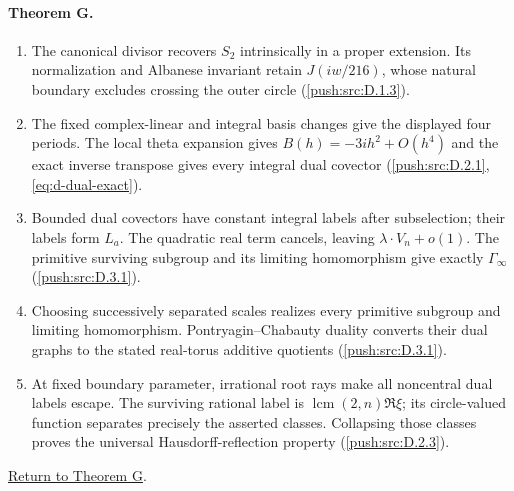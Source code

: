 \documentclass[11pt,a4paper]{article}
\theoremstyle{definition}
\begin{document}
\hypertarget{outline-I-G}{}
\paragraph{Theorem G.}
\begin{enumerate}[label=\arabic*.]
\item\hypertarget{step-I-G-1}{} The canonical divisor recovers
$S_2$ intrinsically in a proper extension.  Its normalization
and Albanese invariant retain $J(iw/216)$, whose natural boundary
excludes crossing the outer circle
(\hyperref[push:src:D.1.3]{\ref*{push:src:D.1.3}}).
\item\hypertarget{step-I-G-2}{} The fixed complex-linear and
integral basis changes give the displayed four periods.
The local theta expansion gives $B(h)=-3ih^2+O(h^4)$ and
the exact inverse transpose gives every integral dual covector
(\hyperref[push:src:D.2.1]{\ref*{push:src:D.2.1}},
\hyperref[eq:d-dual-exact]{\ref*{eq:d-dual-exact}}).
\item\hypertarget{step-I-G-3}{} Bounded dual covectors have
constant integral labels after subselection; their labels form
$L_a$.  The quadratic real term cancels, leaving
$\lambda\cdot V_n+o(1)$.  The primitive surviving subgroup and
its limiting homomorphism give exactly $\Gamma_\infty$
(\hyperref[push:src:D.3.1]{\ref*{push:src:D.3.1}}).
\item\hypertarget{step-I-G-4}{} Choosing successively separated
scales realizes every primitive subgroup and limiting
homomorphism.  Pontryagin--Chabauty duality converts their dual
graphs to the stated real-torus additive quotients
(\hyperref[push:src:D.3.1]{\ref*{push:src:D.3.1}}).
\item\hypertarget{step-I-G-5}{} At fixed boundary parameter,
irrational root rays make all noncentral dual labels escape.
The surviving rational label is
$\operatorname{lcm}(2,n)\Re\xi$; its circle-valued function
separates precisely the asserted classes.  Collapsing those
classes proves the universal Hausdorff-reflection property
(\hyperref[push:src:D.2.3]{\ref*{push:src:D.2.3}}).
\end{enumerate}
\hyperlink{main-I-G}{Return to Theorem G}.

\end{document}
